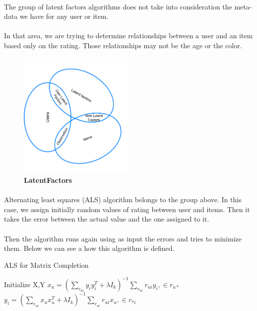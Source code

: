\paragraph{} The group of latent factors algorithms does not take into consideration the meta-data we have for any user or item. 
\paragraph{} In that area, we are trying to determine relationships between a user and an item based only on the rating. Those relationships may not be the age or the color.

\begin{figure}[h]
	\centering
	\includegraphics[width=0.5\textwidth]{images/LatentFactors.png}
	\caption{\bfseries LatentFactors}
	\label{LatentFactors}
\end{figure}


\paragraph{} Alternating least squares (ALS) algorithm belongs to the group above. In this case, we assign initially random values of rating between user and items. Then it takes the error between the actual value and the one assigned to it. 

\paragraph{}Then the algorithm runs again using as input the errors and tries to minimize them. Below we can see a how this algorithm is defined. \\

\begin{algorithm}
	\caption{ALS for Matrix Completion}\label{ALS}
	\begin{algorithmic}[1]
		\State Initialize X,Y
		\Repeat
		\State $x_{u} = (\sum_{r_{ui}}y_{i}y_{i}^{T} + \lambda I_k)^{-1} \sum_{r_{ui}}r_{ui}y_{i} ,\in r_{u*}$
		\EndFor
		\State $y_{i} = (\sum_{r_{ui}}x_{u}x_{u}^{T} + \lambda I_k)^{-1} \sum_{r_{ui}}r_{ui}x_{u} ,\in r_{*i}$
		\EndFor
	\end{algorithmic}
\end{algorithm}

